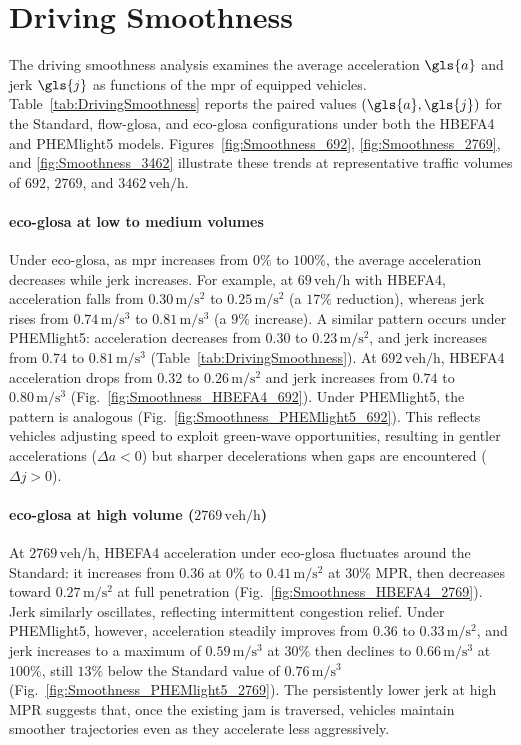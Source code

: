 \section{Driving Smoothness}
\label{sec:Results_Smoothness}

The driving smoothness analysis examines the average acceleration $\gls{a}$ and jerk $\gls{j}$ as functions of the \ac{mpr} of equipped vehicles. Table~\ref{tab:DrivingSmoothness} reports the paired values $(\gls{a},\gls{j})$ for the Standard, \ac{flow-glosa}, and \ac{eco-glosa} configurations under both the HBEFA4 and PHEMlight5 models. Figures~\ref{fig:Smoothness_692}, \ref{fig:Smoothness_2769}, and \ref{fig:Smoothness_3462} illustrate these trends at representative traffic volumes of $692$, $2769$, and $3462\,\mathrm{veh/h}$.

\paragraph{\ac{eco-glosa} at low to medium volumes}
Under \ac{eco-glosa}, as \ac{mpr} increases from $0\%$ to $100\%$, the average acceleration decreases while jerk increases. For example, at $69\,\mathrm{veh/h}$ with HBEFA4, acceleration falls from $0.30\,\mathrm{m/s^2}$ to $0.25\,\mathrm{m/s^2}$ (a $17\%$ reduction), whereas jerk rises from $0.74\,\mathrm{m/s^3}$ to $0.81\,\mathrm{m/s^3}$ (a $9\%$ increase). A similar pattern occurs under PHEMlight5: acceleration decreases from $0.30$ to $0.23\,\mathrm{m/s^2}$, and jerk increases from $0.74$ to $0.81\,\mathrm{m/s^3}$ (Table~\ref{tab:DrivingSmoothness}). At $692\,\mathrm{veh/h}$, HBEFA4 acceleration drops from $0.32$ to $0.26\,\mathrm{m/s^2}$ and jerk increases from $0.74$ to $0.80\,\mathrm{m/s^3}$ (Fig.~\ref{fig:Smoothness_HBEFA4_692}). Under PHEMlight5, the pattern is analogous (Fig.~\ref{fig:Smoothness_PHEMlight5_692}). This reflects vehicles adjusting speed to exploit green-wave opportunities, resulting in gentler accelerations ($\Delta a<0$) but sharper decelerations when gaps are encountered ($\Delta j>0$).

\paragraph{\ac{eco-glosa} at high volume ($2769\,\mathrm{veh/h}$)}
At $2769\,\mathrm{veh/h}$, HBEFA4 acceleration under \ac{eco-glosa} fluctuates around the Standard: it increases from $0.36$ at $0\%$ to $0.41\,\mathrm{m/s^2}$ at $30\%$ MPR, then decreases toward $0.27\,\mathrm{m/s^2}$ at full penetration (Fig.~\ref{fig:Smoothness_HBEFA4_2769}). Jerk similarly oscillates, reflecting intermittent congestion relief. Under PHEMlight5, however, acceleration steadily improves from $0.36$ to $0.33\,\mathrm{m/s^2}$, and jerk increases to a maximum of $0.59\,\mathrm{m/s^3}$ at $30\%$ then declines to $0.66\,\mathrm{m/s^3}$ at $100\%$, still $13\%$ below the Standard value of $0.76\,\mathrm{m/s^3}$ (Fig.~\ref{fig:Smoothness_PHEMlight5_2769}). The persistently lower jerk at high MPR suggests that, once the existing jam is traversed, vehicles maintain smoother trajectories even as they accelerate less aggressively.

